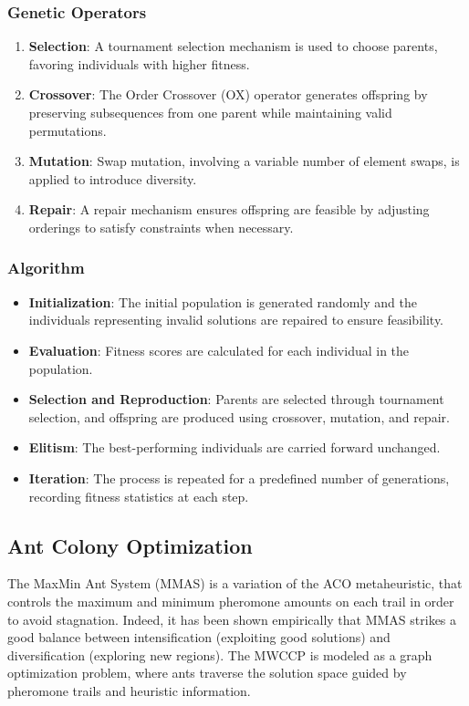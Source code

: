 \documentclass{article}
\begin{document}
\subsubsection*{Genetic Operators}

\begin{enumerate}
    \item \textbf{Selection}: A tournament selection mechanism is used to choose parents, favoring individuals with higher fitness.
    \item \textbf{Crossover}: The Order Crossover (OX) operator generates offspring by preserving subsequences from one parent while maintaining valid permutations.
    \item \textbf{Mutation}: Swap mutation, involving a variable number of element swaps, is applied to introduce diversity.
    \item \textbf{Repair}: A repair mechanism ensures offspring are feasible by adjusting orderings to satisfy constraints when necessary.
\end{enumerate}

\subsubsection*{Algorithm}
\begin{itemize}
    \item \textbf{Initialization}: The initial population is generated randomly and the individuals representing invalid solutions are repaired to ensure feasibility.
    \item \textbf{Evaluation}: Fitness scores are calculated for each individual in the population.
    \item \textbf{Selection and Reproduction}: Parents are selected through tournament selection, and offspring are produced using crossover, mutation, and repair.
    \item \textbf{Elitism}: The best-performing individuals are carried forward unchanged.
    \item \textbf{Iteration}: The process is repeated for a predefined number of generations, recording fitness statistics at each step.
\end{itemize}

\subsection{Ant Colony Optimization}
The MaxMin Ant System (MMAS) is a variation of the ACO metaheuristic, that controls the maximum and minimum pheromone amounts on each trail in order to avoid stagnation. Indeed, it has been shown empirically that MMAS strikes a good balance between intensification (exploiting good solutions) and diversification (exploring new regions). The MWCCP is modeled as a graph optimization problem, where ants traverse the solution space guided by pheromone trails and heuristic information.
\end{document}
